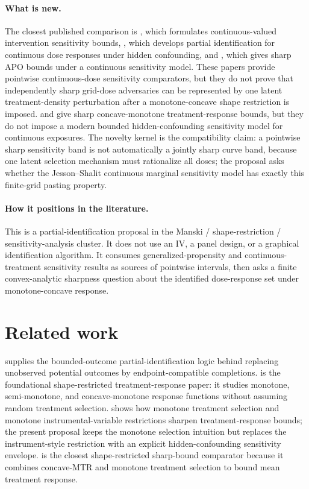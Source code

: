 \documentclass[11pt]{article}
\theoremstyle{definition}
\theoremstyle{plain}
\theoremstyle{remark}
\begin{document}
\paragraph{What is new.}
The closest published comparison is \citet{JessonDouglasManshausenSolalMeinshausenStierGalShalit2022}, which formulates continuous-valued intervention sensitivity bounds, \citet{MarmarelisHaddadJessonJahanshadGalstyanVerSteeg2023}, which develops partial identification for continuous dose responses under hidden confounding, and \citet{BaitairianSebastienJreichKatsahianGuilloux2025}, which gives sharp APO bounds under a continuous sensitivity model.  These papers provide pointwise continuous-dose sensitivity comparators, but they do not prove that independently sharp grid-dose adversaries can be represented by one latent treatment-density perturbation after a monotone-concave shape restriction is imposed.  \citet{Manski1997} and \citet{OkumuraUsui2014} give sharp concave-monotone treatment-response bounds, but they do not impose a modern bounded hidden-confounding sensitivity model for continuous exposures.  The novelty kernel is the compatibility claim: a pointwise sharp sensitivity band is not automatically a jointly sharp curve band, because one latent selection mechanism must rationalize all doses; the proposal asks whether the Jesson--Shalit continuous marginal sensitivity model has exactly this finite-grid pasting property.

\paragraph{How it positions in the literature.}
This is a partial-identification proposal in the Manski / shape-restriction / sensitivity-analysis cluster.  It does not use an IV, a panel design, or a graphical identification algorithm.  It consumes generalized-propensity and continuous-treatment sensitivity results as sources of pointwise intervals, then asks a finite convex-analytic sharpness question about the identified dose-response set under monotone-concave response.

\section{Related work}
\citet{Manski1990} supplies the bounded-outcome partial-identification logic behind replacing unobserved potential outcomes by endpoint-compatible completions.  \citet{Manski1997} is the foundational shape-restricted treatment-response paper: it studies monotone, semi-monotone, and concave-monotone response functions without assuming random treatment selection.  \citet{ManskiPepper2000} shows how monotone treatment selection and monotone instrumental-variable restrictions sharpen treatment-response bounds; the present proposal keeps the monotone selection intuition but replaces the instrument-style restriction with an explicit hidden-confounding sensitivity envelope.  \citet{OkumuraUsui2014} is the closest shape-restricted sharp-bound comparator because it combines concave-MTR and monotone treatment selection to bound mean treatment response.
\end{document}
